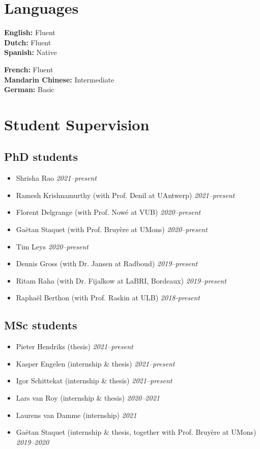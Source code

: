 \documentclass[10pt,a4paper]{moderncv}
\begin{document}
\section{Languages}
\begin{minipage}[t]{.48\linewidth}
	\textbf{English:} Fluent\\
	\textbf{Dutch:} Fluent\\
	\textbf{Spanish:} Native
\end{minipage}
\hfill
\begin{minipage}[t]{.48\linewidth}
	\textbf{French:} Fluent\\
	\textbf{Mandarin Chinese:} Intermediate\\
	\textbf{German:} Basic
\end{minipage}

\section{Student Supervision}
\subsection{PhD students}
\begin{itemize}
  \item Shrisha Rao \hfill \textit{2021--present}
  \item Ramesh Krishnamurthy (with Prof. Denil at UAntwerp) \hfill \textit{2021--present}
  \item Florent Delgrange (with Prof. Now\'e at VUB) \hfill
    \textit{2020--present}
  \item Ga\"etan Staquet (with Prof. Bruy\`ere at UMons) \hfill
    \textit{2020--present}
  \item Tim Leys \hfill \textit{2020--present}
  \item Dennis Gross (with Dr. Jansen at Radboud) \hfill
    \textit{2019--present} 
  \item Ritam Raha (with Dr. Fijalkow at LaBRI, Bordeaux) \hfill \textit{2019--present}
  \item Rapha\"el Berthon (with Prof. Raskin at ULB) \hfill
    \textit{2018-present}
\end{itemize}


\subsection{MSc students}
\begin{itemize}
  \item Pieter Hendriks (thesis) \hfill \textit{2021--present}
  \item Kasper Engelen (internship \& thesis) \hfill \textit{2021--present}
  \item Igor Schittekat (internship \& thesis) \hfill \textit{2021--present}
  \item Lars van Roy (internship \& thesis) \hfill \textit{2020--2021}
  \item Laurens van Damme (internship) \hfill \textit{2021}
  \item Ga\"etan Staquet (internship \& thesis, together with Prof. Bruy\`ere
    at UMons) \hfill \textit{2019--2020}
\end{itemize}
\end{document}
